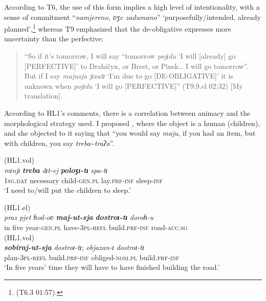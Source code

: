 \documentclass[output=paper,colorlinks,citecolor=brown]{langscibook}
\begin{document}
According to T6, the use of this form implies a high level of intentionality, with a sense of commitment “\textit{namjereno, ʋʒe zadumano}” ‘purposefully/intended, already planned’,\footnote{(T6.3 01:57).} whereas T9 emphasized that the de-obligative expresses more uncertainty than the perfective:

\begin{quote}
    “So if it’s tomorrow, I will say “tomorrow \textit{pojɪdu} ‘I will [already] go [\MakeUppercase{perfective}]’ to Drahičyn, or Brest, or Pinsk… I will go tomorrow”. But if I say \textit{majusja jɪxatɪ} ‘I’m due to go [\MakeUppercase{de-obligative}]’ it is unknown when \textit{pojɪdu }‘I will go [\MakeUppercase{perfective}]” (T9.9.el 02:32) [My translation].
\end{quote}

According to HL1’s comments, there is a correlation between animacy and the morphological strategy used. I proposed , where the object is a human (children), and she objected to it saying that “you would say\textit{ maju}, if you had an item, but with children, you say \textit{treba}\sim\textit{tra}\textit{ʔa}”.

\ea \label{ex:roncero:11}
     \label{ex:roncero:11a}

    \ex (HL1.vol) \textrangle{}\textrangle \label{ex:roncero:11b}\\
    \gll \textit{mɪnjɪ} \textbf{\textit{treba}} \textit{dɪt-ej} \textbf{\textit{poloʒɪ-tɪ}} \textit{spa-tɪ}\\
    1\textsc{sg.dat} necessary child-\textsc{gen.pl} lay.\textsc{prf-inf} sleep-\textsc{inf}\\
    \glt ‘I need to/will put the children to sleep.’
\z
\z

\ea \label{ex:roncero:12}
    \ea (HL1.el) \label{ex:roncero:12a}\\
    \gll \textit{praz} \textit{pjet} \textit{ɦod-oʋ} \textbf{\textit{maj-ut-sja}} \textbf{\textit{dostroɪ-tɪ}} \textit{doroɦ-u}\\
    in five year-\textsc{gen.pl} have-\textsc{3pl-refl} build.\textsc{prf-inf} road-\textsc{acc.sg}\\
    \ex (HL1.vol) \textrangle{}\textrangle \label{ex:roncero:12b}\\
    \gll \textbf{\textit{sobiraj-ut-sja}} \textit{dostroɪ-tɪ}; \textit{objazan-ɪ} \textit{dostroɪ-tɪ}\\
    plan-\textsc{3pl-refl} build.\textsc{prf-inf} obliged-\textsc{nom.pl} build.\textsc{prf-inf}\\
    \glt ‘In five years’ time they will have to have finished building the road.’
\z
\z
\end{document}
